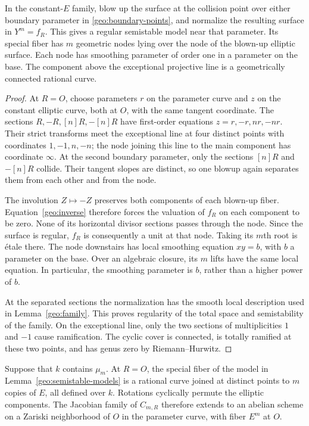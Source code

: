 \begin{lemma}\label{geo:semistable-models}
In the constant-$E$ family, blow up the surface at the collision point
over either boundary parameter in \eqref{geo:boundary-points}, and
normalize the resulting surface in $Y^m=f_R$.  This gives a regular
semistable model near that parameter.  Its special fiber has $m$
geometric nodes lying over the node of the blown-up elliptic surface.
Each node has smoothing parameter of order one in a parameter on the
base.  The component above the exceptional projective line is a
geometrically connected rational curve.
\end{lemma}

\begin{proof}
At $R=O$, choose parameters $r$ on the parameter curve and $z$ on the
constant elliptic curve, both at $O$, with the same tangent coordinate.
The sections $R,-R,[n]R,-[n]R$ have first-order equations
$z=r,-r,nr,-nr$.  Their strict transforms meet the exceptional line
at four distinct points with coordinates $1,-1,n,-n$; the node joining
this line to the main component has coordinate $\infty$.  At the second
boundary parameter, only the sections $[n]R$ and $-[n]R$ collide.  Their
tangent slopes are distinct, so one blowup again separates them from
each other and from the node.

The involution $Z\mapsto-Z$ preserves both components of each blown-up
fiber.  Equation~\eqref{geo:inverse} therefore forces the valuation of
$f_R$ on each component to be zero.  None of its horizontal divisor
sections passes through the node.  Since the surface is regular,
$f_R$ is consequently a unit at that node.  Taking its $m$th root is
\'etale there.  The node downstairs has local smoothing equation
$xy=b$, with $b$ a parameter on the base.  Over an algebraic closure,
its $m$ lifts have the same local equation.  In particular, the
smoothing parameter is $b$, rather than a higher power of $b$.

At the separated sections the normalization has the smooth local
description used in Lemma~\ref{geo:family}.  This proves regularity
of the total space and semistability of the family.  On the exceptional
line, only the two sections of multiplicities $1$ and $-1$ cause
ramification.  The cyclic cover is connected, is totally ramified at
these two points, and has genus zero by Riemann--Hurwitz.
\end{proof}

\begin{proposition}\label{geo:compact-type}
Suppose that $k$ contains $\mu_m$.  At $R=O$, the special fiber of the
model in Lemma~\ref{geo:semistable-models} is a rational curve joined
at distinct points to $m$ copies of $E$, all defined over $k$.  Rotations
cyclically permute the elliptic components.  The Jacobian family of
$C_{m,R}$ therefore extends to an abelian scheme on a Zariski
neighborhood of $O$ in the parameter curve, with fiber $E^m$ at $O$.
\end{proposition}

